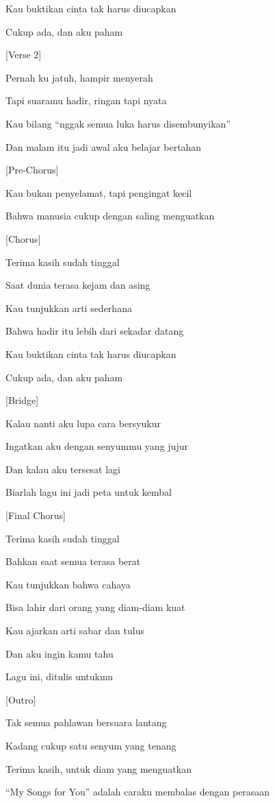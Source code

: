 \documentclass[
  letterpaper,
  DIV=11,
  numbers=noendperiod]{scrreprt}
\begin{document}
Kau buktikan cinta tak harus diucapkan

Cukup ada, dan aku paham

{[}Verse 2{]}

Pernah ku jatuh, hampir menyerah

Tapi suaramu hadir, ringan tapi nyata

Kau bilang ``nggak semua luka harus disembunyikan''

Dan malam itu jadi awal aku belajar bertahan

{[}Pre-Chorus{]}

Kau bukan penyelamat, tapi pengingat kecil

Bahwa manusia cukup dengan saling menguatkan

{[}Chorus{]}

Terima kasih sudah tinggal

Saat dunia terasa kejam dan asing

Kau tunjukkan arti sederhana

Bahwa hadir itu lebih dari sekadar datang

Kau buktikan cinta tak harus diucapkan

Cukup ada, dan aku paham

{[}Bridge{]}

Kalau nanti aku lupa cara bersyukur

Ingatkan aku dengan senyummu yang jujur

Dan kalau aku tersesat lagi

Biarlah lagu ini jadi peta untuk kembal

{[}Final Chorus{]}

Terima kasih sudah tinggal

Bahkan saat semua terasa berat

Kau tunjukkan bahwa cahaya

Bisa lahir dari orang yang diam-diam kuat

Kau ajarkan arti sabar dan tulus

Dan aku ingin kamu tahu

Lagu ini, ditulis untukmu

{[}Outro{]}

Tak semua pahlawan bersuara lantang

Kadang cukup satu senyum yang tenang

Terima kasih, untuk diam yang menguatkan

``My Songs for You'' adalah caraku membalas dengan perasaan

\end{document}
